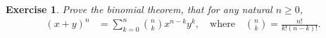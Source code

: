\documentclass{article}[12pt]
\newtheorem{exercise}{Exercise}[section]
\begin{document}
        
        \begin{exercise}
            Prove the binomial theorem, that for any natural $n \ge 0$,
            \begin{align}
                (x + y)^n
                &= \sum_{k=0}^n \binom{n}{k} x^{n-k} y^k,\quad
                \text{where}\quad
                \binom{n}{k} = \frac{n!}{k! (n-k)!}.
            \end{align}
        \end{exercise}
        
        
\end{document}
